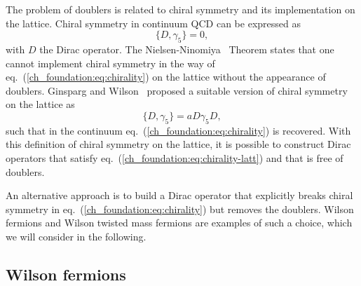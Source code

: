 The problem of doublers is related to chiral symmetry and its implementation on the lattice. Chiral symmetry in continuum QCD can be expressed as 
\begin{equation}
\label{ch_foundation:eq:chirality}
\{D,\gamma_5\}=0,
\end{equation}
with $D$ the Dirac operator. The Nielsen-Ninomiya~\citep{Nielsen:1980rz,Nielsen:1981hk} Theorem states that one cannot implement chiral symmetry in the way of eq.~(\ref{ch_foundation:eq:chirality}) on the lattice without the appearance of doublers. Ginsparg and Wilson~\citep{Ginsparg:1981bj} proposed a suitable version of chiral symmetry on the lattice as
\begin{equation}
\label{ch_foundation:eq:chirality-latt}
\{D,\gamma_5\}=aD\gamma_5D,
\end{equation}
such that in the continuum eq.~(\ref{ch_foundation:eq:chirality}) is recovered. With this definition of chiral symmetry on the lattice, it is possible to construct Dirac operators that satisfy eq.~(\ref{ch_foundation:eq:chirality-latt}) and that is free of doublers. 

An alternative approach is to build a Dirac operator that explicitly breaks chiral symmetry in eq.~(\ref{ch_foundation:eq:chirality}) but removes the doublers. Wilson fermions and Wilson twisted mass fermions are examples of such a choice, which we will consider in the following.


\subsection{Wilson fermions}
\label{ch_foundation:subsec:Wilson}

